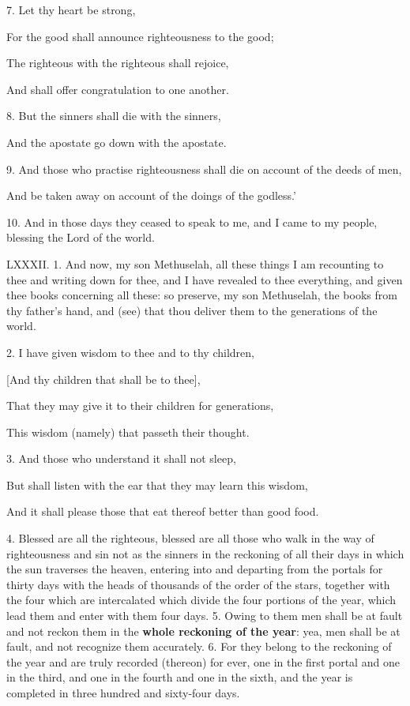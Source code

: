 7. Let thy heart be strong,

For the good shall announce righteousness to the good;

The righteous with the righteous shall rejoice,

And shall offer congratulation to one another.

8. But the sinners shall die with the sinners,

And the apostate go down with the apostate.

9. And those who practise righteousness shall die on account of the deeds of men,

And be taken away on account of the doings of the godless.’

10. And in those days they ceased to speak to me,
and I came to my people, blessing the Lord of the
world.


LXXXII. 1. And now, my son Methuselah, all
these things I am recounting to thee and writing down
for thee, and I have revealed to thee everything, and
given thee books concerning all these: so preserve, my
son Methuselah, the books from thy father’s hand, and
(see) that thou deliver them to the generations of the
world.

2. I have given wisdom to thee and to thy children,

[And thy children that shall be to thee],

That they may give it to their children for generations,

This wisdom (namely) that passeth their thought.

3. And those who understand it shall not sleep,

But shall listen with the ear that they may learn this wisdom,

And it shall please those that eat thereof better than good food.

4. Blessed are all the righteous, blessed are all those
who walk in the way of righteousness and sin not as
the sinners in the reckoning of all their days in which
the sun traverses the heaven, entering into and departing
from the portals for thirty days with the heads of
thousands of the order of the stars, together with the
four which are intercalated which divide the four
portions of the year, which lead them and enter with
them four days. 5. Owing to them men shall be at
fault and not reckon them in the \textbf{whole reckoning of
the year}: yea, men shall be at fault, and not recognize
them accurately. 6. For they belong to the reckoning
of the year and are truly recorded (thereon) for
ever, one in the first portal and one in the third, and
one in the fourth and one in the sixth, and the year
is completed in three hundred and sixty-four days.

